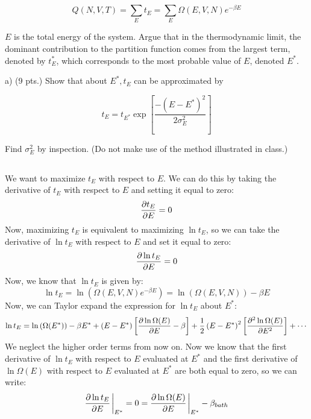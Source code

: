 \documentclass[10pt]{article}
\begin{document}
$$
Q(N, V, T)=\sum_{E} t_{E}=\sum_{E} \Omega(E, V, N) e^{-\beta E}
$$

$E$ is the total energy of the system. Argue that in the thermodynamic limit, the dominant contribution to the partition function comes from the largest term, denoted by $t_{E}^{*}$, which corresponds to the most probable value of $E$, denoted $E^{*}$.

a) (9 pts.) Show that about $E^{*}, t_{E}$ can be approximated by

$$
t_{E}=t_{E^{*}} \exp \left[\frac{-\left(E-E^{*}\right)^{2}}{2 \sigma_{E}^{2}}\right]
$$

Find $\sigma_{E}^{2}$ by inspection. (Do not make use of the method illustrated in class.)
\subsection{}
We want to maximize $t_{E}$ with respect to $E$. We can do this by taking the derivative of $t_{E}$ with respect to $E$ and setting it equal to zero:
\begin{equation}
  \pdv{t_{E}}{E} = 0
\end{equation}
Now, maximizing $t_{E}$ is equivalent to maximizing $\ln t_{E}$, so we can take the derivative of $\ln t_{E}$ with respect to $E$ and set it equal to zero:
\begin{equation}
  \pdv{\ln t_{E}}{E} = 0 
\end{equation}
Now, we know that $\ln t_{E}$ is given by:
\begin{equation}
  \ln t_{E} = \ln \left( \Omega(E, V, N) e^{-\beta E} \right) = \ln \left( \Omega(E, V, N) \right) - \beta E
\end{equation}
Now, we can Taylor expand the expression for $\ln t_{E}$ about $E^{*}$:
\begin{equation}
  \ln t_{E} = \ln \left( \Omega(E^{*}) \right) - \beta E^{*} + \left( E - E^{*} \right) \left[ \pdv{\ln \Omega(E)}{E} - \beta \right] + \frac{1}{2} \left( E - E^{*} \right)^{2} \left[ \pdv[2]{\ln \Omega(E)}{E} \right] + \cdots
\end{equation}
We neglect the higher order terms from now on.
Now we know that the first derivative of $\ln t_{E}$ with respect to $E$ evaluated at $E^{*}$ and the first derivative of $\ln \Omega(E)$ with respect to $E$ evaluated at $E^{*}$ are both equal to zero, so we can write:
\begin{equation}
  \pdv{\ln t_{E}}{E} \eval_{E^{*}} = 0 = \pdv{\ln \Omega(E)}{E} \eval_{E^{*}} - \beta_{bath}
\end{equation}
\end{document}
